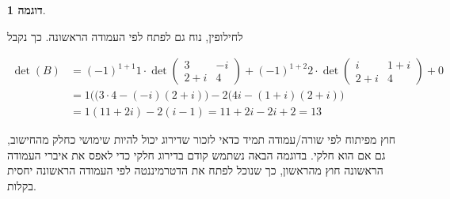 \documentclass[12pt]{report}
\theoremstyle{plain}
\theoremstyle{definition}
\newtheorem{example}{דוגמה}[chapter]
\newcommand{\0}{\mathbf{0}}
\begin{document}
\begin{example}
\begin{enumerate}[label=\alph*.]
לחילופין, נוח גם לפתח לפי העמודה הראשונה. כך נקבל

$$
\begin{aligned}
\det(B)&=(-1)^{1+1}1\cdot
\det\!\begin{pmatrix}
3 & -i \\
2+i & 4
\end{pmatrix}
+(-1)^{1+2}
2\cdot
\det\!\begin{pmatrix}
i & 1+i \\
2+i & 4
\end{pmatrix}+0 \\
&=1\bigl((3\cdot 4 - (-i)(2+i)\bigr)
-
2\bigl(4i - (1+i)(2+i)\bigr)
\\
&=
1(11+2i)
-
2(i-1)
=
11+2i -2i+2
=
13
\end{aligned}
$$


\end{enumerate}
\end{example}

חוץ מפיתוח לפי שורה/עמודה תמיד כדאי לזכור שדירוג יכול להיות שימושי כחלק מהחישוב, גם אם הוא חלקי. בדוגמה הבאה נשתמש קודם בדירוג חלקי כדי לאפס את איברי העמודה הראשונה חוץ מהראשון, כך שנוכל לפתח את הדטרמיננטה לפי העמודה הראשונה יחסית בקלות.
\end{document}
